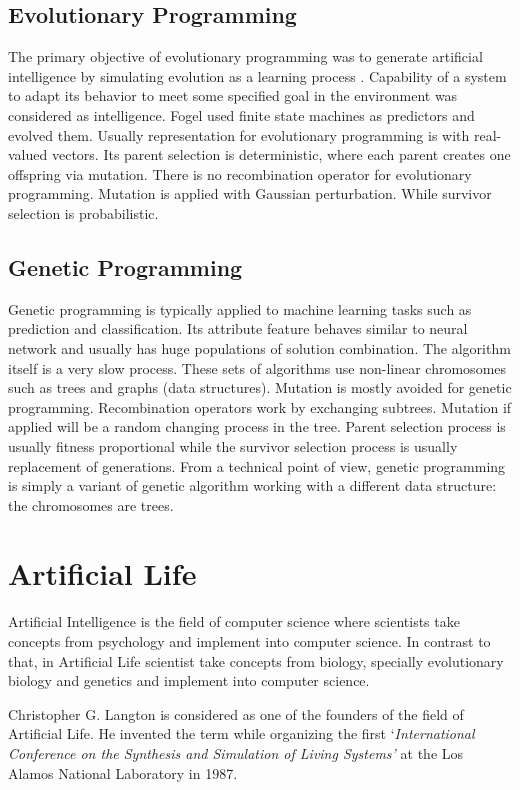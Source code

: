 \subsection{Evolutionary Programming}
The primary objective of evolutionary programming was to generate artificial intelligence by simulating evolution as a learning process \cite{fogel1966}. Capability of a system to adapt its behavior to meet some specified goal in the environment was considered as intelligence. Fogel used finite state machines as predictors and evolved them. Usually representation for evolutionary programming is with real-valued vectors. Its parent selection is deterministic, where each parent creates one offspring via mutation. There is no recombination operator for evolutionary programming. Mutation is applied with Gaussian perturbation. While survivor selection is probabilistic. 

\subsection{Genetic Programming}
Genetic programming is typically applied to machine learning tasks such as prediction and classification. Its attribute feature behaves similar to neural network and usually has huge populations of solution combination. The algorithm itself is a very slow process. These sets of algorithms use non-linear chromosomes such as trees and graphs (data structures). Mutation is mostly avoided for genetic programming. Recombination operators work by exchanging subtrees. Mutation if applied will be a random changing process in the tree. Parent selection process is usually fitness proportional while the survivor selection process is usually replacement of generations. From a technical point of view, genetic programming is simply a variant of genetic algorithm working with a different data structure: the chromosomes are trees. 

\section{Artificial Life}
Artificial Intelligence is the field of computer science where scientists take concepts from psychology and implement into computer science. In contrast to that, in Artificial Life scientist take concepts from biology, specially evolutionary biology and genetics and implement into computer science. 

Christopher G. Langton is considered as one of the founders of the field of Artificial Life. He invented the term while organizing the first `\textsl{International Conference on the Synthesis and Simulation of Living Systems'} at the Los Alamos National Laboratory in 1987.

